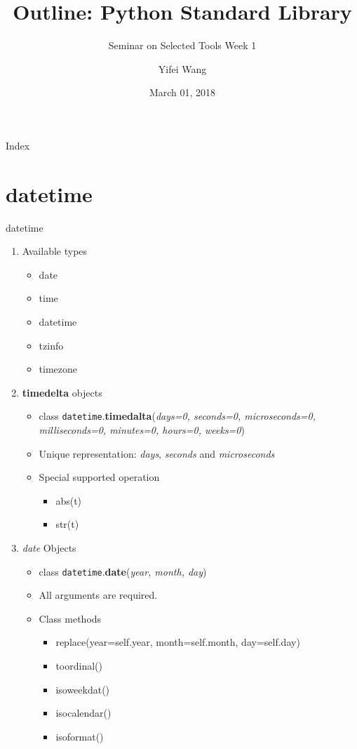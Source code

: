 \documentclass[xcolor=table]{mysld}
\title{Outline: Python Standard Library}
\subtitle{Seminar on Selected Tools Week 1}
\author{Yifei Wang}
\date{March 01, 2018}
\begin{document}
\begin{frame}
\titlepage
\end{frame}

\begin{frame}{Index}
\tableofcontents
\end{frame}

\section{datetime}
\begin{frame}[allowframebreaks]{datetime}
\begin{enumerate}
\item Available types
\begin{itemize}
\item date
\item time
\item datetime
\item tzinfo
\item timezone
\end{itemize}
\item \textbf{timedelta} objects
\begin{itemize}
\item class \texttt{datetime}.\textbf{timedalta}(\textit{days=0, seconds=0, microseconds=0, milliseconds=0, minutes=0, hours=0, weeks=0}) 
\item Unique representation: \textit{days}, \textit{seconds} and \textit{microseconds}
\item Special supported operation
\begin{itemize}
\item abs(t)
\item str(t)
\end{itemize}
\end{itemize}
\framebreak
\item \textit{date} Objects
\begin{itemize}
\item class \texttt{datetime}.\textbf{date}(\textit{year, month, day})
\item All arguments are required. 
\item Class methods
\begin{itemize}
\item replace(year=self.year, month=self.month, day=self.day)
\item toordinal()
\item isoweekdat()
\item isocalendar()
\item isoformat()

\end{itemize}
\end{itemize}
\end{enumerate}
\end{frame}
\end{document}
